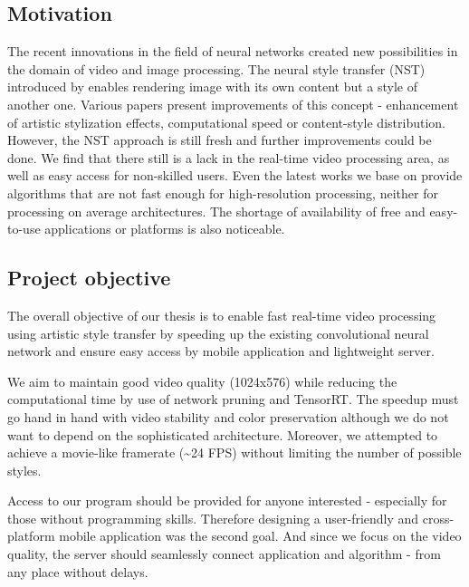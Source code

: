 \documentclass[../Main.tex]{subfiles}
\begin{document}
\subsection{Motivation}
The recent innovations in the field of neural networks created new possibilities in the domain of video and image processing. The neural style transfer (NST) introduced by \cite{gatys2015neural} enables rendering image with its own content but a style of another one. Various papers present improvements of this concept - enhancement of artistic stylization effects, computational speed or content-style distribution. However, the NST approach is still fresh and further improvements could be done. We find that there still is a lack in the real-time video processing area, as well as easy access for non-skilled users. Even the latest works we base on provide algorithms that are not fast enough for high-resolution processing, neither for processing on average architectures. The shortage of availability of free and easy-to-use applications or platforms is also noticeable.


\subsection{Project objective}
The overall objective of our thesis is to enable fast real-time video processing using artistic style transfer by speeding up the existing convolutional neural network and ensure easy access by mobile application and lightweight server.

We aim to maintain good video quality (1024x576) while reducing the computational time by use of network pruning and TensorRT. The speedup must go hand in hand with video stability and color preservation although we do not want to depend on the sophisticated architecture. Moreover, we attempted to achieve a movie-like framerate (\textasciitilde{}24 FPS) without limiting the number of possible styles.

Access to our program should be provided for anyone interested - especially for those without programming skills. Therefore designing a user-friendly and cross-platform mobile application was the second goal. And since we focus on the video quality, the server should seamlessly connect application and algorithm - from any place without delays.

\newpage
\end{document}
